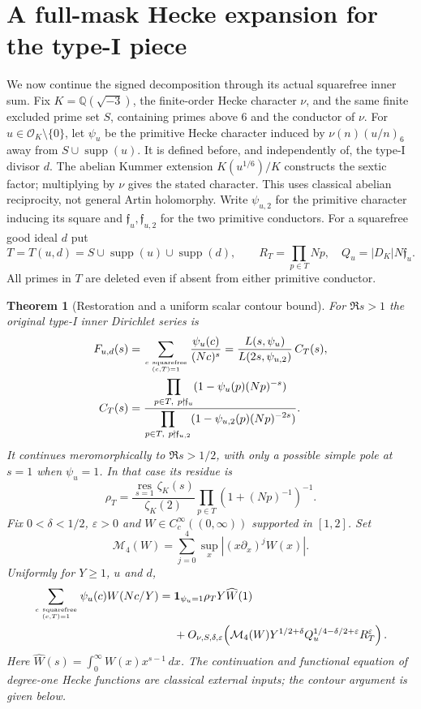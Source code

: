 \documentclass[11pt,oneside,openany]{book}
\newtheorem{theorem}{Theorem}[chapter]
\theoremstyle{definition}\newtheorem{definition}[theorem]{Definition}
\theoremstyle{remark}\newtheorem{remark}[theorem]{Remark}
\begin{document}
\section{A full-mask Hecke expansion for the type-I piece}
\label{hti:core}
We now continue the signed decomposition through its actual squarefree
inner sum. Fix $K=\mathbb Q(\sqrt{-3})$, the finite-order Hecke character
$\nu$, and the same finite excluded prime set $S$, containing primes above
$6$ and the conductor of $\nu$. For $u\in\mathcal O_K\setminus\{0\}$,
let $\psi_u$ be the primitive Hecke character induced by
$\nu(n)(u/n)_6$ away from $S\cup\operatorname{supp}(u)$.
It is defined before, and independently of, the type-I divisor $d$.
The abelian Kummer extension $K(u^{1/6})/K$ constructs the sextic
factor; multiplying by $\nu$ gives the stated character.
This uses classical abelian reciprocity, not general Artin holomorphy.
Write $\psi_{u,2}$ for the primitive character inducing its square and
$\mathfrak f_u,\mathfrak f_{u,2}$ for the two primitive conductors.
For a squarefree good ideal $d$ put
\[
 T=T(u,d)=S\cup\operatorname{supp}(u)\cup\operatorname{supp}(d),\qquad
 R_T=\prod_{p\in T}Np,\quad Q_u=|D_K|N\mathfrak f_u.
\]
All primes in $T$ are deleted even if absent from either primitive conductor.

\begin{theorem}[Restoration and a uniform scalar contour bound]
\label{hti:theorem}
For $\Re s>1$ the original type-I inner Dirichlet series is
\begin{align}
 F_{u,d}(s)
 &=\sum_{c\ {\rm squarefree}\atop(c,T)=1}
       \frac{\psi_u(c)}{(Nc)^s}
   =\frac{L(s,\psi_u)}{L(2s,\psi_{u,2})}\,C_T(s),\label{hti:ratio}\\
 C_T(s)
 &=\frac{\displaystyle\prod_{p\in T,\ p\nmid\mathfrak f_u}
             (1-\psi_u(p)(Np)^{-s})}
          {\displaystyle\prod_{p\in T,\ p\nmid\mathfrak f_{u,2}}
             (1-\psi_{u,2}(p)(Np)^{-2s})}.
 \label{hti:restore}
\end{align}
It continues meromorphically to $\Re s>1/2$, with only a possible
simple pole at $s=1$ when $\psi_u=1$. In that case its residue is
\[
 \rho_T=\frac{\operatorname*{res}_{s=1}\zeta_K(s)}{\zeta_K(2)}
             \prod_{p\in T}(1+(Np)^{-1})^{-1}.
\]
Fix $0<\delta<1/2$, $\varepsilon>0$ and
$W\in C_c^\infty((0,\infty))$ supported in $[1,2]$. Set
\[\mathcal M_4(W)=\sum_{j=0}^4\sup_x|(x\partial_x)^jW(x)|.\]
Uniformly for $Y\ge1$, $u$ and $d$,
\begin{align}
 \sum_{c\ {\rm squarefree}\atop(c,T)=1}\psi_u(c)W(Nc/Y)
 ={}&\mathbf1_{\psi_u=1}\rho_TY\widehat W(1)\notag\\
 &+O_{\nu,S,\delta,\varepsilon}\!\left(
 \mathcal M_4(W)Y^{1/2+\delta}
 Q_u^{1/4-\delta/2+\varepsilon}R_T^\varepsilon\right).
 \label{hti:scalar}
\end{align}
Here $\widehat W(s)=\int_0^\infty W(x)x^{s-1}\,dx$.
The continuation and functional equation of degree-one Hecke functions
are classical external inputs; the contour argument is given below.
\end{theorem}
\end{document}
